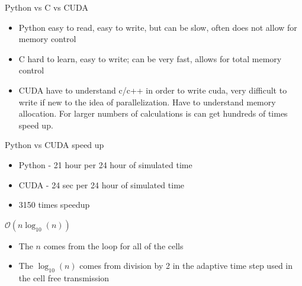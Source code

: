 \documentclass{beamer}
\begin{document}
\begin{frame}{Python vs C vs CUDA}
    \begin{center}
        \begin{itemize}
            \item Python easy to read, easy to write, but can be slow, often does not allow for memory control
            \item C hard to learn, easy to write; can be very fast, allows for total memory control
            \item CUDA have to understand c/c++ in order to write cuda, very difficult to write if new to the idea of parallelization. Have to understand memory allocation. For larger numbers of calculations is can get hundreds of times speed up. 

        \end{itemize}
    \end{center}
\end{frame}

\begin{frame}{Python vs CUDA speed up}
    \begin{center}
        \begin{itemize}
            \item Python - 21 hour per 24 hour of simulated time
            \item CUDA - 24 sec per  24 hour of simulated time
        \end{itemize}

        \begin{itemize}
            \item 3150 times speedup
        \end{itemize}
    \end{center}
\end{frame}

\begin{frame}{}
    \begin{center}
        $\mathcal{O}(n\log_{10} (n))$

    \begin{itemize}
        \item The $n$ comes from the loop for all of the cells
        \item The $\log_{10} (n)$ comes from division by 2 in the adaptive time step used in the cell free transmission
    \end{itemize}
    \end{center}
\end{frame}
\end{document}
